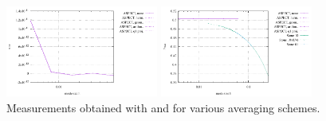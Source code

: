 \begin{center}
\includegraphics[width=5cm]{images/stokes_sphere3D/pressure_mean_FS}
\includegraphics[width=5cm]{images/stokes_sphere3D/pressure_max_FS}\\
{\captionfont Measurements obtained with \aspect and  for various averaging schemes.}
\end{center}

